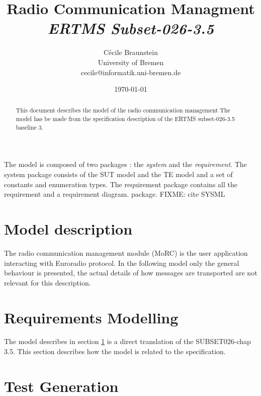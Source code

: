 \documentclass[11pt,notitlepage]{article}
\title{Radio Communication Managment \\
    {\it ERTMS Subset-026-3.5}}
\author{C{\'e}cile Braunstein\\University of Bremen\\
cecile@informatik.uni-bremen.de}
\date{\today}                                           %
\newcommand{\FIXME}[1]{\marginpar{FIXME}\textsf{FIXME: #1}}
\begin{document}
\maketitle

\begin{abstract}
This document describes the model of the radio communication management The
model has be made from the specification description of the ERTMS subset-026-3.5
baseline 3.
\end{abstract}
The model is composed of two packages : the \emph{system} and the
\emph{requirement}. The system package consists of the SUT model and the TE
model and a set of constants and enumeration types. The
requirement package contains all the requirement and a requirement diagram.
package.
\FIXME{cite SYSML}
\section{Model description}
\label{sec:modeldescription}
The radio communication management module (MoRC) is the user application interacting
with Euroradio protocol. In the following model only the general behaviour is
presented, the actual details of how messages are transported are not relevant
for this description.

\section{Requirements Modelling}
\label{sec:requirements}
The model describes in section \ref{sec:modeldescription} is a direct
translation of the SUBSET026-chap 3.5. This section describes how the model is
related to the specification.

\section{Test Generation}
\label{sec:tests}

%


\end{document}
